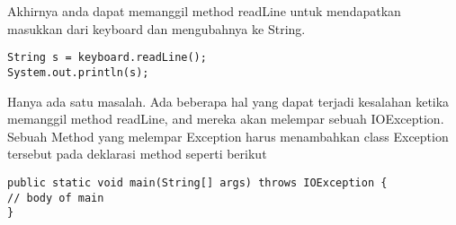 Akhirnya anda dapat memanggil method readLine untuk mendapatkan masukkan dari keyboard dan mengubahnya ke String.
\begin{lstlisting}
String s = keyboard.readLine();
System.out.println(s);
\end{lstlisting}

Hanya ada satu masalah. Ada beberapa hal yang dapat terjadi kesalahan ketika memanggil method readLine, and mereka akan melempar sebuah IOException. Sebuah Method yang melempar Exception harus menambahkan class Exception tersebut pada deklarasi method seperti berikut

\begin{lstlisting}
public static void main(String[] args) throws IOException {
// body of main
}
\end{lstlisting}

